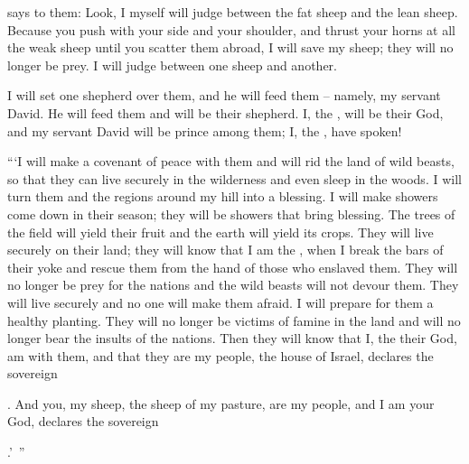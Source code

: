 {{}
says
to
them: Look,
I myself
will judge
between
the fat
sheep
and
the lean
sheep.
Because
you push with your side
and your shoulder,
and thrust
your horns
at
all
the weak
sheep
until
you scatter
them abroad,
I will save
my sheep;
they will
no
longer
be
prey.
I will judge
between
one sheep
and another.
\par }{\PP {}I will set
one
shepherd
over
them, and he will feed them – namely, my servant David. He will feed them and will be their shepherd.
I,
the {}, will be
their God,
and my servant
David
will be prince
among
them; I,
the {},
have spoken!
\par }{\PP {}“‘I will make
a covenant
of peace
with them and will rid
the land
of wild beasts,
so that they can live
securely
in the wilderness
and even sleep
in the woods.
I
will turn
them and the regions around
my hill
into a blessing.
I will make showers
come down
in their season;
they will be
showers
that
bring blessing.
The trees
of the field
will
yield their fruit
and the earth
will yield
its crops. They will live securely
on
their land;
they will know
that
I am
the {},
when I break
the
bars
of their yoke
and rescue
them from the hand
of those who enslaved them.
They will
no
longer
be prey
for the nations
and the wild beasts
will not
devour
them. They will live
securely
and no
one will make them afraid.
I will prepare
for them a healthy
planting.
They will
no
longer
be victims
of famine
in the land
and will no
longer
bear
the insults
of the nations.
Then they will know
that
I,
the {}
their God,
am with
them, and that they
are my people,
the house
of Israel,
declares
the sovereign

{}.
And you,
my sheep,
the sheep
of my pasture,
are my people,
and I am
your God,
declares
the sovereign

{}.’ ”

\par }
